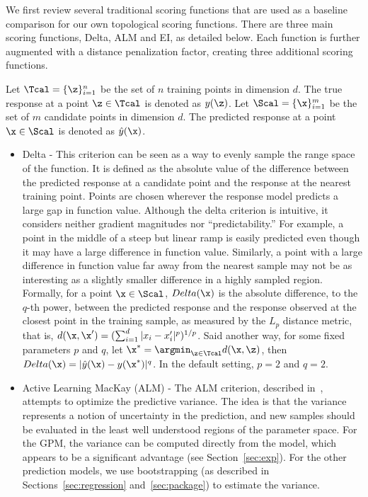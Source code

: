 We first review several traditional scoring functions that are used as a baseline comparison for our own topological scoring functions.
%
There are three main scoring functions, Delta, ALM and EI, as detailed below.
%
Each function is further augmented with a distance penalization factor, creating three additional scoring functions.

Let $\Tcal = \{\z\}_{i=1}^{n}$ be the set of $n$ training points in dimension $d$.
%
The true response at a point $\z \in \Tcal$ is denoted as $y(\z)$.
%
Let $\Scal = \{\x\}_{i=1}^{m}$ be the set of $m$ candidate points in dimension $d$.
%
The predicted response at a point $\x \in \Scal$ is denoted as $\hat{y}(\x)$.
\begin{itemize}
\item{Delta - This criterion can be seen as a way to evenly sample the range space of the function.
%
It is defined as the absolute value of the difference between the predicted response at a candidate point and the response at the nearest training point.
%
Points are chosen wherever the response model predicts a large gap in function value.
%
Although the delta criterion is intuitive, it considers neither gradient magnitudes nor ``predictability.''
%
For example, a point in the middle of a steep but linear ramp is easily predicted even though it may have a large difference in function value.
%
Similarly, a point with a large difference in function value far away from the nearest sample may not be as interesting as a slightly smaller difference in a highly sampled region.
%
Formally, for a point $\x \in \Scal$, $Delta(\x)$ is the absolute difference, to the $q$-th power, between the predicted response and the response observed at the closest point in the training sample, as measured by the $L_p$ distance metric, that is, $d(\x,\x') = (\sum_{i=1}^{d}|x_i-x'_i|^p)^{1/p}$.
%
Said another way, for some fixed parameters $p$ and $q$, let $\x^* = \argmin_{\z \in \Tcal} d(\x,\z)$, then $Delta(\x) = |\hat{y}(\x) - y(\x^*)|^q$.
%
In the default setting, $p = 2$ and $q = 2$.}

\item{Active Learning MacKay (ALM) - The ALM criterion, described in~\cite{MacKay1992}, attempts to optimize the predictive variance.
%
The idea is that the variance represents a notion of uncertainty in the prediction, and new samples should be evaluated in the least well understood regions of the parameter space.
%
For the GPM, the variance can be computed directly from the model, which appears to be a significant advantage (see Section~\ref{sec:exp}).
%
For the other prediction models, we use bootstrapping (as described in Sections~\ref{sec:regression} and~\ref{sec:package}) to estimate the variance.}


\end{itemize}
